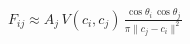 \documentclass[border=6pt]{standalone}
\begin{document}
\color{black}
\(\displaystyle
F_{ij}
\approx
A_j\,
V(c_i,c_j)\,
\frac{\cos\theta_i\,\cos\theta_j}{\pi \lVert c_j-c_i\rVert^2}
\)
\end{document}
